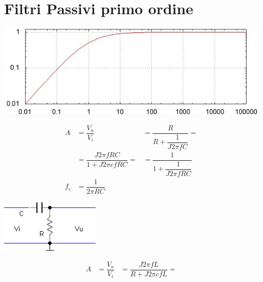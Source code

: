 \chapter{Filtri Passivi primo ordine}
\label{cha:Filtripassiviprimoord}
\minitoc
\mtcskip                                %
\minilof                                %
\mtcskip                                %
\minilot
\begin{table}
 \begin{minipage}{0.4\textwidth}
      \centering
       \includegraphics{filtropa}
     \end{minipage}
\begin{minipage}[t]{0.6\textwidth}
      \centering
       \begin{align*}
A&=\dfrac{V_{u}}{V_{i}}
&=\dfrac{R}{R+\dfrac{1}{J2\pi fC}}=\\
&=\dfrac{J2\pi fRC}{1+J2\pi cfRC}=
&=\dfrac{1}{1+\dfrac{1}{J2\pi fRC}}\\
f_{c}&=\dfrac{1}{2\pi RC}
        \end{align*}
     \end{minipage}\hfill
     \begin{minipage}{0.4\textwidth}
      \centering
       \includegraphics{filtro_PA_CR}
     \end{minipage}
\begin{minipage}[t]{0.4\textwidth}
      \centering
       \begin{align*}
A&=\dfrac{V_{u}}{V_{i}}&=\dfrac{J2\pi fL}{R+J2\pi cfL}=\\

\end{align*}
\end{minipage}
\end{table}
